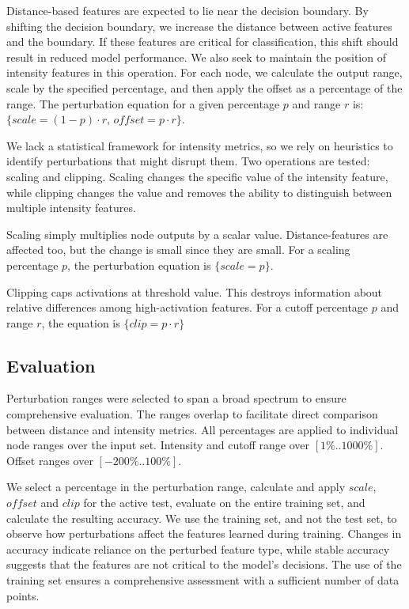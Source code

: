 Distance-based features are expected to lie near the decision boundary. By shifting the decision boundary, we increase the distance between active features and the boundary. If these features are critical for classification, this shift should result in reduced model performance. We also seek to maintain the position of intensity features in this operation. For each node, we calculate the output range, scale by the specified percentage, and then apply the offset as a percentage of the range. The perturbation equation for a given percentage $p$ and range $r$ is: $\{scale = (1-p) \cdot r,\, offset = p \cdot r \}$.

We lack a statistical framework for intensity metrics, so we rely on heuristics to identify perturbations that might disrupt them. Two operations are tested: scaling and clipping. Scaling changes the specific value of the intensity feature, while clipping changes the value and removes the ability to distinguish between multiple intensity features.

Scaling simply multiplies node outputs by a scalar value. Distance-features are affected too, but the change is small since they are small. For a scaling percentage $p$, the perturbation equation is $\{scale = p\}$.

Clipping caps activations at threshold value. This destroys information about relative differences among high-activation features. For a cutoff percentage $p$ and range $r$, the equation is $\{clip = p \cdot r\}$

\subsection{Evaluation}

Perturbation ranges were selected to span a broad spectrum to ensure comprehensive evaluation. The ranges overlap to facilitate direct comparison between distance and intensity metrics. All percentages are applied to individual node ranges over the input set. Intensity and cutoff range over $[1\%..1000\%]$. Offset ranges over $[-200\%..100\%]$.

We select a percentage in the perturbation range, calculate and apply $scale$, $offset$ and $clip$ for the active test, evaluate on the entire training set, and calculate the resulting accuracy. We use the training set, and not the test set, to observe how perturbations affect the features learned during training. Changes in accuracy indicate reliance on the perturbed feature type, while stable accuracy suggests that the features are not critical to the model's decisions. The use of the training set ensures a comprehensive assessment with a sufficient number of data points.
